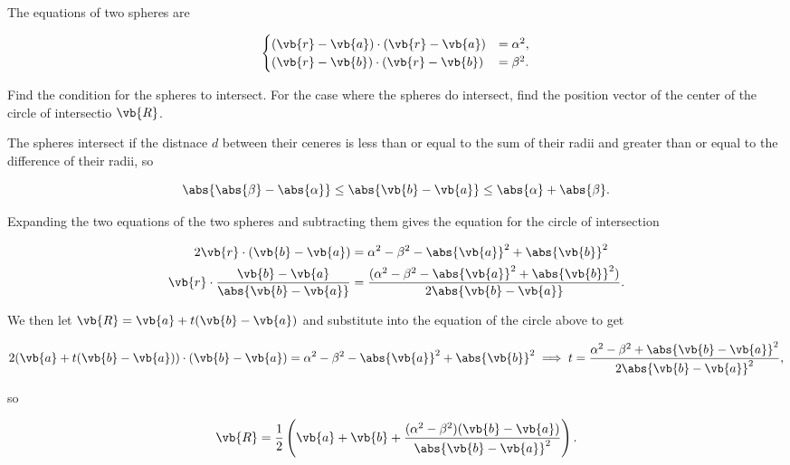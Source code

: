 \documentclass[a4paper,12pt]{report}
\begin{document}
{The equations of two spheres are 

\begin{equation}
    \begin{cases}
        (\vb{r} -\vb{a} ) \cdot (\vb{r} -\vb{a} )&=\alpha ^2,\\
        (\vb{r} -\vb{b} ) \cdot (\vb{r} -\vb{b} )&=\beta ^2.
    \end{cases}
\end{equation}

Find the condition for the spheres to intersect. For the case where the spheres do intersect, find the position vector of the center of the circle of intersectio \(\vb{R}\). 
}
{The spheres intersect if the distnace \(d\) between their ceneres is less than or equal to the sum of their radii and greater than or equal to the difference of their radii, so 

\begin{equation}
    \abs{\abs{\beta } - \abs{\alpha }  } \le \abs{\vb{b} -\vb{a} } \le \abs{\alpha } + \abs{\beta }.  
\end{equation}

Expanding the two equations of the two spheres and subtracting them gives the equation for the circle of intersection

\begin{equation}
    \begin{aligned} 
    2\vb{r} \cdot (\vb{b} -\vb{a} )  &= \alpha ^2-\beta ^2 - \abs{\vb{a} }^2 + \abs{\vb{b} }^2\\
    \vb{r} \cdot \frac{\vb{b} -\vb{a} }{\abs{\vb{b} -\vb{a} } } &= \frac{(\alpha ^2-\beta ^2 - \abs{\vb{a} }^2 + \abs{\vb{b} }^2)}{2\abs{\vb{b} -\vb{a} } }.
    \end{aligned} 
\end{equation}

We then let \(\vb{R} = \vb{a} + t(\vb{b} -\vb{a} )\) and substitute into the equation of the circle above to get 

\begin{equation}
    2 (\vb{a} +t(\vb{b} -\vb{a} )) \cdot (\vb{b} -\vb{a} ) = \alpha ^2-\beta ^2-\abs{\vb{a} }^2+\abs{\vb{b} }^2 \implies t = \frac{\alpha ^2-\beta ^2+\abs{\vb{b} -\vb{a} }^2 }{2\abs{\vb{b} -\vb{a} }^2 },     
\end{equation}

so 

\begin{equation}
    \vb{R} = \frac{1}{2} \left( \vb{a} +\vb{b} +\frac{(\alpha ^2-\beta ^2)(\vb{b} -\vb{a} )}{\abs{\vb{b} -\vb{a} }^2 }  \right).
\end{equation}

}
\end{document}
